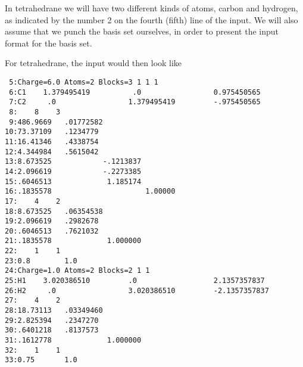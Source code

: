 In tetrahedrane we will have two different kinds of atoms, carbon
and hydrogen, as indicated by the number 2 on the fourth (fifth)
line of the input. We will also assume that we punch the basis set
ourselves, in order to present the input format for the basis set.

For tetrahedrane, the input would then look like
\begin{verbatim}
 5:Charge=6.0 Atoms=2 Blocks=3 1 1 1
 6:C1    1.379495419          .0                 0.975450565
 7:C2     .0                 1.379495419         -.975450565
 8:    8    3
 9:486.9669   .01772582
10:73.37109   .1234779
11:16.41346   .4338754
12:4.344984   .5615042
13:8.673525            -.1213837
14:2.096619            -.2273385
15:.6046513             1.185174
16:.1835578                      1.00000
17:    4    2
18:8.673525   .06354538
19:2.096619   .2982678
20:.6046513   .7621032
21:.1835578             1.000000
22:    1    1
23:0.8        1.0
24:Charge=1.0 Atoms=2 Blocks=2 1 1
25:H1    3.020386510         .0                  2.1357357837
26:H2     .0                 3.020386510         -2.1357357837
27:    4    2
28:18.73113   .03349460
29:2.825394   .2347270
30:.6401218   .8137573
31:.1612778             1.000000
32:    1    1
33:0.75       1.0
\end{verbatim}

